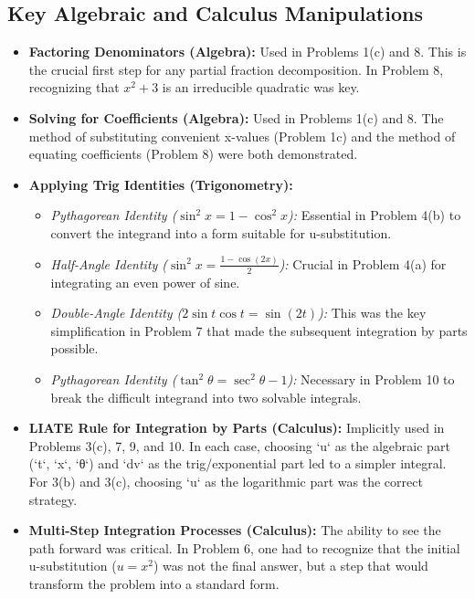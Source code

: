 \documentclass{article}
\begin{document}
\subsection{Key Algebraic and Calculus Manipulations}
\begin{itemize}
    \item \textbf{Factoring Denominators (Algebra):} Used in Problems 1(c) and 8. This is the crucial first step for any partial fraction decomposition. In Problem 8, recognizing that $x^2+3$ is an irreducible quadratic was key.
    \item \textbf{Solving for Coefficients (Algebra):} Used in Problems 1(c) and 8. The method of substituting convenient x-values (Problem 1c) and the method of equating coefficients (Problem 8) were both demonstrated.
    \item \textbf{Applying Trig Identities (Trigonometry):}
    \begin{itemize}
        \item \textit{Pythagorean Identity ($\sin^2x = 1-\cos^2x$):} Essential in Problem 4(b) to convert the integrand into a form suitable for u-substitution.
        \item \textit{Half-Angle Identity ($\sin^2x = \frac{1-\cos(2x)}{2}$):} Crucial in Problem 4(a) for integrating an even power of sine.
        \item \textit{Double-Angle Identity ($2\sin t \cos t = \sin(2t)$):} This was the key simplification in Problem 7 that made the subsequent integration by parts possible.
        \item \textit{Pythagorean Identity ($\tan^2\theta = \sec^2\theta - 1$):} Necessary in Problem 10 to break the difficult integrand into two solvable integrals.
    \end{itemize}
    \item \textbf{LIATE Rule for Integration by Parts (Calculus):} Implicitly used in Problems 3(c), 7, 9, and 10. In each case, choosing `u` as the algebraic part (`t`, `x`, `θ`) and `dv` as the trig/exponential part led to a simpler integral. For 3(b) and 3(c), choosing `u` as the logarithmic part was the correct strategy.
    \item \textbf{Multi-Step Integration Processes (Calculus):} The ability to see the path forward was critical. In Problem 6, one had to recognize that the initial u-substitution ($u=x^2$) was not the final answer, but a step that would transform the problem into a standard form.
\end{itemize}
\end{document}
